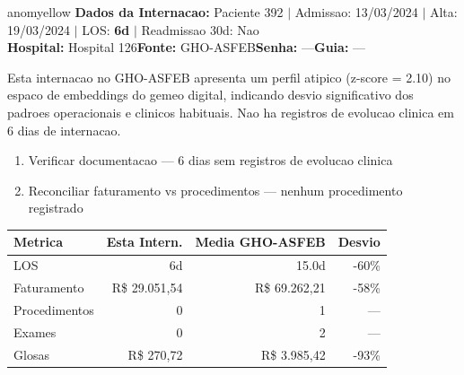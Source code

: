 \documentclass[a4paper,10pt]{article}
\begin{document}
\begin{anomalycard}[Internacao 144 | GHO-ASFEB | MODERADO (z=2.10)]{anomyellow}
\textbf{Dados da Internacao:} Paciente 392 $\mid$ Admissao: 13/03/2024 $\mid$ Alta: 19/03/2024 $\mid$ LOS: \textbf{6d} $\mid$ Readmissao 30d: Nao\\
\textbf{Hospital:} Hospital 126\quad\textbf{Fonte:} GHO-ASFEB\quad\textbf{Senha:} ---\quad\textbf{Guia:} ---\\
\vspace{2pt}\begin{tcolorbox}[colback=severityred!20,colframe=anomyellow,title={\textbf{Interpretacao de Negocio}},fonttitle=\bfseries\small,left=4pt,right=4pt,top=3pt,bottom=3pt]
{\small Esta internacao no GHO-ASFEB apresenta um perfil atipico (z-score = 2.10) no espaco de embeddings do gemeo digital, indicando desvio significativo dos padroes operacionais e clinicos habituais. Nao ha registros de evolucao clinica em 6 dias de internacao.}
\end{tcolorbox}
\begin{tcolorbox}[colback=severityyellow!30,colframe=anomorange,title={\textbf{Recomendacoes Especificas}},fonttitle=\bfseries\small,left=4pt,right=4pt,top=3pt,bottom=3pt]
\begin{enumerate}[nosep,leftmargin=16pt]
\item {\small Verificar documentacao --- 6 dias sem registros de evolucao clinica}
\item {\small Reconciliar faturamento vs procedimentos --- nenhum procedimento registrado}
\end{enumerate}
\end{tcolorbox}
\begin{center}\begin{tabular}{l r r r}\toprule\textbf{Metrica} & \textbf{Esta Intern.} & \textbf{Media GHO-ASFEB} & \textbf{Desvio} \\\midrule
LOS & 6d & 15.0d & -60\% \\
Faturamento & R\$ 29.051,54 & R\$ 69.262,21 & -58\% \\
Procedimentos & 0 & 1 & --- \\
Exames & 0 & 2 & --- \\
Glosas & R\$ 270,72 & R\$ 3.985,42 & -93\% \\
\bottomrule\end{tabular}\end{center}


\end{anomalycard}
\end{document}
